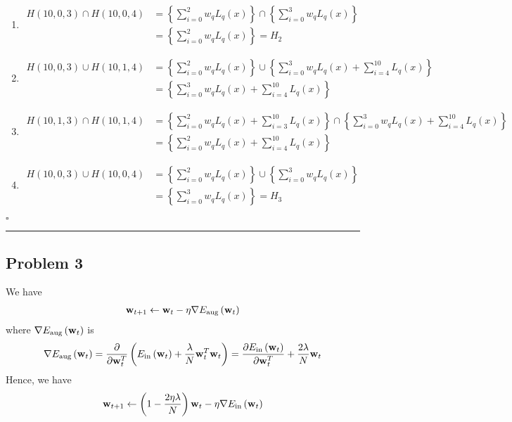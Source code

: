 \documentclass[12pt]{article}
\newcommand*{\QEDB}{\hfill\ensuremath{\square}}
\newcommand{\CBrackets}[1]{\left\{#1\right\}}
\newcommand{\ParTh}[1]{\left(#1\right)}
\newcommand{\BF}[1]{{\bf#1}}
\newcommand{\horrule}[1]{\rule{\linewidth}{#1}}
\begin{document}
\begin{enumerate}
	\item
	\begin{align}
	H\ParTh{10,0,3}\cap H\ParTh{10,0,4}&=\CBrackets{\sum_{i=0}^{2}w_qL_q\ParTh{x}}\cap\CBrackets{\sum_{i=0}^{3}w_qL_q\ParTh{x}}\\
	&=\CBrackets{\sum_{i=0}^{2}w_qL_q\ParTh{x}}=H_2
	\end{align}
	\item
	\begin{align}
	H\ParTh{10,0,3}\cup H\ParTh{10,1,4}&=\CBrackets{\sum_{i=0}^{2}w_qL_q\ParTh{x}}\cup\CBrackets{\sum_{i=0}^{3}w_qL_q\ParTh{x}+\sum_{i=4}^{10}L_q\ParTh{x}}\\
	&=\CBrackets{\sum_{i=0}^{3}w_qL_q\ParTh{x}+\sum_{i=4}^{10}L_q\ParTh{x}}
	\end{align}
	\item
	\begin{align}
	H\ParTh{10,1,3}\cap H\ParTh{10,1,4}&=\CBrackets{\sum_{i=0}^{2}w_qL_q\ParTh{x}+\sum_{i=3}^{10}L_q\ParTh{x}}\cap\CBrackets{\sum_{i=0}^{3}w_qL_q\ParTh{x}+\sum_{i=4}^{10}L_q\ParTh{x}}\\
	&=\CBrackets{\sum_{i=0}^{2}w_qL_q\ParTh{x}+\sum_{i=4}^{10}L_q\ParTh{x}}
	\end{align}
	\item
	\begin{align}
	H\ParTh{10,0,3}\cup H\ParTh{10,0,4}&=\CBrackets{\sum_{i=0}^{2}w_qL_q\ParTh{x}}\cup\CBrackets{\sum_{i=0}^{3}w_qL_q\ParTh{x}}\\
	&=\CBrackets{\sum_{i=0}^{3}w_qL_q\ParTh{x}}=H_3
	\end{align}
\end{enumerate}

\QEDB

\horrule{0.5pt}

\subsection*{Problem 3}

We have
\begin{align}
\BF{w}_{t+1}\leftarrow\BF{w}_{t}-\eta\nabla E_{\text{aug}}\ParTh{\BF{w}_t}
\end{align}
where $\nabla E_{\text{aug}}\ParTh{\BF{w}_t}$ is
\begin{align}
\nabla E_{\text{aug}}\ParTh{\BF{w}_t}=\dfrac{\partial}{\partial\BF{w}^T_t}\ParTh{E_{\text{in}}\ParTh{\BF{w}_t}+\dfrac{\lambda}{N}\BF{w}^T_t\BF{w}_t}=\dfrac{\partial E_{\text{in}}\ParTh{\BF{w}_t}}{\partial\BF{w}^T_t}+\dfrac{2\lambda}{N}\BF{w}_t
\end{align}
Hence, we have
\begin{align}
\BF{w}_{t+1}\leftarrow\ParTh{1-\dfrac{2\eta\lambda}{N}}\BF{w}_{t}-\eta\nabla E_{\text{in}}\ParTh{\BF{w}_t}
\end{align}
\end{document}
